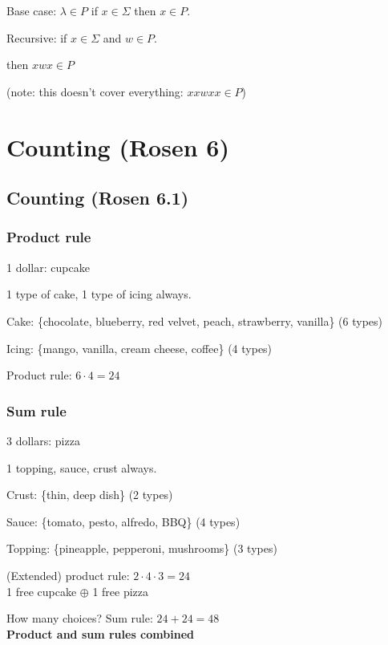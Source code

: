 \documentclass[english,openany]{book}
\begin{document}
    Base case: $\lambda \in P$ if $x \in \Sigma$ then $x \in P$.

    Recursive: if $x \in \Sigma$ and $w \in P$.

    then $xwx \in P$

    (note: this doesn't cover everything: $xxwxx \in P$)\\


	\chapter{Counting (Rosen 6)}

    \section{Counting (Rosen 6.1)}

    \subsection{Product rule}

    1 dollar: cupcake

    1 type of cake, 1 type of icing always.

    Cake: \{chocolate, blueberry, red velvet, peach, strawberry, vanilla\} (6 types)

    Icing: \{mango, vanilla, cream cheese, coffee\} (4 types)

    Product rule: $6 \cdot 4 = 24$\\

    \subsection{Sum rule}

    3 dollars: pizza

    1 topping, sauce, crust always.

    Crust: \{thin, deep dish\} (2 types)

    Sauce: \{tomato, pesto, alfredo, BBQ\} (4 types)

    Topping: \{pineapple, pepperoni, mushrooms\} (3 types)

    (Extended) product rule: $2 \cdot 4 \cdot 3 = 24$\\

    1 free cupcake $\oplus$ 1 free pizza

    How many choices? Sum rule: $24 + 24 = 48$\\

    \textbf{Product and sum rules combined}
\end{document}
